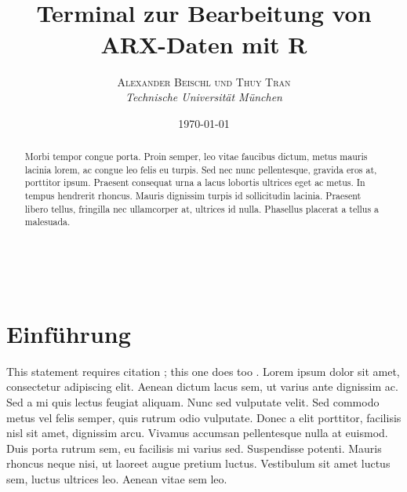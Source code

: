 \documentclass[a4paper, 12pt]{report} %
\title{\textbf{}\\ %
Terminal zur Bearbeitung von ARX-Daten mit R} %
\author{\textsc{Alexander Beischl und Thuy Tran} %
\\{\textit{Technische Universität München}}} %
\date{\today} %
\makeatletter
\renewcommand{\maketitle}{ %
\begin{flushright} %
{\LARGE\@title} %

\vspace{50pt} %

{\large\@author} %
\\\@date %

\vspace{40pt} %
\end{flushright}
}
\makeatother
\begin{document}
\maketitle %


\renewcommand{\abstractname}{Zusammenfassung} %

\begin{abstract}
Morbi tempor congue porta. Proin semper, leo vitae faucibus dictum, metus mauris lacinia lorem, ac congue leo felis eu turpis. Sed nec nunc pellentesque, gravida eros at, porttitor ipsum. Praesent consequat urna a lacus lobortis ultrices eget ac metus. In tempus hendrerit rhoncus. Mauris dignissim turpis id sollicitudin lacinia. Praesent libero tellus, fringilla nec ullamcorper at, ultrices id nulla. Phasellus placerat a tellus a malesuada.
\end{abstract}


\vspace{30pt} %

\tableofcontents



\chapter{Einführung}\label{einführung}

This statement requires citation \cite{latexcompanion}; this one does too \cite{einstein}. Lorem ipsum dolor sit amet, consectetur adipiscing elit. Aenean dictum lacus sem, ut varius ante dignissim ac. Sed a mi quis lectus feugiat aliquam. Nunc sed vulputate velit. Sed commodo metus vel felis semper, quis rutrum odio vulputate. Donec a elit porttitor, facilisis nisl sit amet, dignissim arcu. Vivamus accumsan pellentesque nulla at euismod. Duis porta rutrum sem, eu facilisis mi varius sed. Suspendisse potenti. Mauris rhoncus neque nisi, ut laoreet augue pretium luctus. Vestibulum sit amet luctus sem, luctus ultrices leo. Aenean vitae sem leo.
\end{document}

